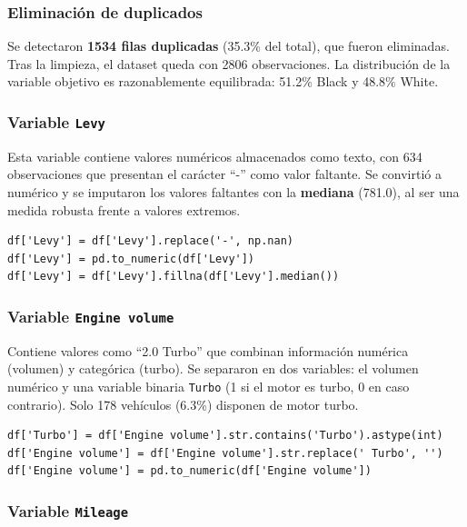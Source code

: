 \documentclass[12pt,a4paper]{article}
\begin{document}
\subsubsection{Eliminación de duplicados}

Se detectaron \textbf{1534 filas duplicadas} (35.3\% del total), que fueron eliminadas. Tras la limpieza, el dataset queda con 2806 observaciones. La distribución de la variable objetivo es razonablemente equilibrada: 51.2\% Black y 48.8\% White.

\subsubsection{Variable \texttt{Levy}}

Esta variable contiene valores numéricos almacenados como texto, con 634 observaciones que presentan el carácter ``-'' como valor faltante. Se convirtió a numérico y se imputaron los valores faltantes con la \textbf{mediana} (781.0), al ser una medida robusta frente a valores extremos.

\begin{lstlisting}[caption={Tratamiento de Levy}]
df['Levy'] = df['Levy'].replace('-', np.nan)
df['Levy'] = pd.to_numeric(df['Levy'])
df['Levy'] = df['Levy'].fillna(df['Levy'].median())
\end{lstlisting}

\subsubsection{Variable \texttt{Engine volume}}

Contiene valores como ``2.0 Turbo'' que combinan información numérica (volumen) y categórica (turbo). Se separaron en dos variables: el volumen numérico y una variable binaria \texttt{Turbo} (1 si el motor es turbo, 0 en caso contrario). Solo 178 vehículos (6.3\%) disponen de motor turbo.

\begin{lstlisting}[caption={Separación de Engine volume y Turbo}]
df['Turbo'] = df['Engine volume'].str.contains('Turbo').astype(int)
df['Engine volume'] = df['Engine volume'].str.replace(' Turbo', '')
df['Engine volume'] = pd.to_numeric(df['Engine volume'])
\end{lstlisting}

\subsubsection{Variable \texttt{Mileage}}
\end{document}
